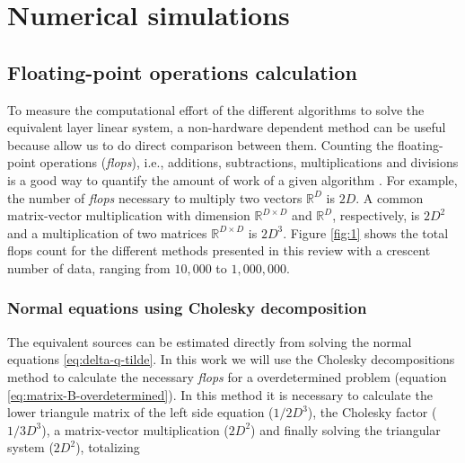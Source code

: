 \section{Numerical simulations}
\label{sec:num_simulations}

 
\subsection{Floating-point operations calculation}

To measure the computational effort of the different algorithms to solve the equivalent layer linear system, a non-hardware dependent method can be useful because allow us to do direct comparison between them. Counting the floating-point operations (\textit{flops}), i.e., additions, subtractions, multiplications and divisions is a good way to quantify the amount of work of a given algorithm \citep{golub-vanloan2013}. For example, the number of \textit{flops} necessary to multiply two vectors $\mathbb{R}^{D}$ is $2D$. A common matrix-vector multiplication with dimension $\mathbb{R}^{D \times D}$ and $\mathbb{R}^{D}$, respectively, is $2D^2$ and a multiplication of two matrices $\mathbb{R}^{D \times D}$ is $2D^3$. Figure \ref{fig:1} shows the total flops count for the different methods presented in this review with a crescent number of data, ranging from $10,000$ to $1,000,000$. 

\subsubsection{Normal equations using Cholesky decomposition}

The equivalent sources can be estimated directly from solving the normal equations \ref{eq:delta-q-tilde}. In this work we will use the Cholesky decompositions method to calculate the necessary \textit{flops} for a overdetermined problem (equation \ref{eq:matrix-B-overdetermined}). In this method it is necessary to calculate the lower triangule matrix of the left side equation ($1/2 D^3$), the Cholesky factor ($1/3 D^3$), a matrix-vector multiplication ($2D^2$) and finally solving the triangular system ($2D^2$), totalizing

